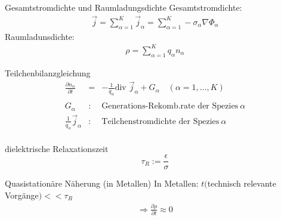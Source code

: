 \documentclass[a6paper]{kartei}
\renewcommand{\div}{\mathrm{div}\;}
\begin{document}
\begin{karte}{Gesamtstromdichte und Raumladungsdichte}
Gesamtstromdichte:
 \begin{eqnarray*}
  \vec{j} = \sum \limits_{\alpha = 1}^{K} \vec{j}_{\alpha} =\sum \limits_{\alpha = 1}^{K}  -\sigma_\alpha \nabla \Phi_\alpha
\end{eqnarray*}
Raumladunsdichte:
\begin{eqnarray*}
  \rho =  \sum \limits_{\alpha = 1}^{K} q_{\alpha} n_{\alpha}
 \end{eqnarray*}
\end{karte}



\begin{karte}{Teilchenbilanzgleichung}
 \begin{eqnarray*}
  \frac{\partial n_{\alpha}}{\partial t} & = & - \frac{1}{q_{\alpha}} \div \vec{j}_{\alpha} + G_{\alpha} \quad (\alpha = 1, \dots , K) \\
 \nonumber \\
G_{\alpha} & : & \text{Generations-Rekomb.rate der Spezies} \ \alpha \nonumber \\
\frac{1}{q_{\alpha}} \vec{j}_{\alpha} & : & \text{Teilchenstromdichte der Spezies} \ \alpha \nonumber \\
 \end{eqnarray*}

\end{karte}


\begin{karte}{dielektrische Relaxationszeit}
$$\tau_{R} := \frac{\epsilon}{\sigma}$$
\end{karte}

\begin{karte}{Quasistationäre Näherung (in Metallen)}
In Metallen: $t($technisch relevante Vorgänge$) << \tau_{R}$
\begin{eqnarray*}
  \Rightarrow \frac{\partial \rho}{\partial t} \approx 0
 \end{eqnarray*}
\end{karte}
\end{document}
